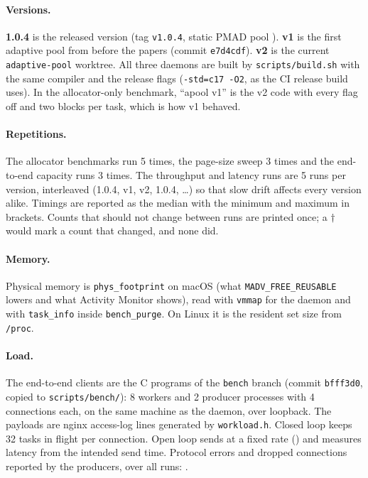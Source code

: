 \documentclass[10.5pt,a4paper]{article}
\newcommand{\file}[1]{\texttt{\small #1}}
\begin{document}
\paragraph{Versions.} \textbf{1.0.4} is the released version (tag \texttt{v1.0.4}, static PMAD pool \citep{pmad}). \textbf{v1} is the first adaptive pool from before the papers (commit \texttt{e7d4cdf}). \textbf{v2} is the current \texttt{adaptive-pool} worktree. All three daemons are built by \file{scripts/build.sh} with the same compiler and the release flags (\texttt{-std=c17 -O2}, as the CI release build uses). In the allocator-only benchmark, ``apool v1'' is the v2 code with every flag off and two blocks per task, which is how v1 behaved.

\paragraph{Repetitions.} The allocator benchmarks run 5 times, the page-size sweep 3 times and the end-to-end capacity runs 3 times. The throughput and latency runs are 5 runs per version, interleaved (1.0.4, v1, v2, 1.0.4, \dots) so that slow drift affects every version alike. Timings are reported as the median with the minimum and maximum in brackets. Counts that should not change between runs are printed once; a $\dagger$ would mark a count that changed, and none did.

\paragraph{Memory.} Physical memory is \texttt{phys\_footprint} on macOS (what \texttt{MADV\_FREE\_REUSABLE} lowers and what Activity Monitor shows), read with \texttt{vmmap} for the daemon and with \texttt{task\_info} inside \file{bench\_purge}. On Linux it is the resident set size from \file{/proc}.

\paragraph{Load.} The end-to-end clients are the C programs of the \texttt{bench} branch (commit \texttt{bfff3d0}, copied to \file{scripts/bench/}): 8 workers and 2 producer processes with 4 connections each, on the same machine as the daemon, over loopback. The payloads are nginx access-log lines generated by \file{workload.h}. Closed loop keeps 32 tasks in flight per connection. Open loop sends at a fixed rate (\openRate{}) and measures latency from the intended send time. Protocol errors and dropped connections reported by the producers, over all runs: \throughputErrors{}.
\end{document}
